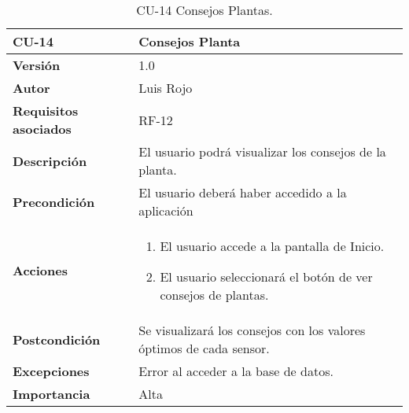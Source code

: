 \begin{table}[p]
	\centering
	\begin{tabularx}{\linewidth}{ p{} p{} }
		\toprule
		\textbf{CU-14}    & \textbf{Consejos Planta}\\
		\toprule
		\textbf{Versión}              & 1.0    \\
		\textbf{Autor}                & Luis Rojo \\
		\textbf{Requisitos asociados} & RF-12 \\
		\textbf{Descripción}          & El usuario podrá visualizar los consejos de la planta. \\
		\textbf{Precondición}         &  El usuario deberá haber accedido a la aplicación \\
		\textbf{Acciones}             &
		\begin{enumerate}
			\def\labelenumi{\arabic{enumi}.}
			\tightlist
			\item El usuario accede a la pantalla de Inicio.
                \item El usuario seleccionará el botón de ver consejos de plantas.
		\end{enumerate}\\
		\textbf{Postcondición}        & Se visualizará los consejos con los valores óptimos de cada sensor. \\
		\textbf{Excepciones}          &  Error al acceder a la base de datos.
           \\
		\textbf{Importancia}          & Alta  \\
		\bottomrule
	\end{tabularx}
	\caption{CU-14 Consejos Plantas.}
\end{table}

